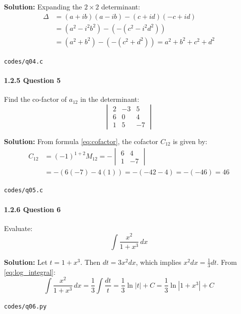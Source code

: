 \documentclass{article}
\begin{document}
\textbf{Solution:} Expanding the $2 \times 2$ determinant:
\begin{align}
\Delta &= (a + ib)(a - ib) - (c + id)(-c + id) \\
&= (a^2 - i^2 b^2) - (-(c^2 - i^2 d^2)) \\
&= (a^2 + b^2) - (-(c^2 + d^2)) = a^2 + b^2 + c^2 + d^2
\end{align}
\begin{tcolorbox}[colback=gray!10,colframe=black,width=\linewidth]
\texttt{codes/q04.c}
\end{tcolorbox}

\paragraph{1.2.5 Question 5}
Find the co-factor of $a_{12}$ in the determinant:
\begin{equation}
\begin{vmatrix} 2 & -3 & 5 \\ 6 & 0 & 4 \\ 1 & 5 & -7 \end{vmatrix}
\end{equation}

\textbf{Solution:} From formula \eqref{eq:cofactor}, the cofactor $C_{12}$ is given by:
\begin{align}
C_{12} &= (-1)^{1+2} M_{12} = -\begin{vmatrix} 6 & 4 \\ 1 & -7 \end{vmatrix} \\
&= -(6(-7) - 4(1)) = -(-42 - 4) = -(-46) = 46
\end{align}
\begin{tcolorbox}[colback=gray!10,colframe=black,width=\linewidth]
\texttt{codes/q05.c}
\end{tcolorbox}

\paragraph{1.2.6 Question 6}
Evaluate:
\begin{equation}
\int \frac{x^2}{1 + x^3} \, dx
\end{equation}

\textbf{Solution:} Let $t = 1 + x^3$. Then $dt = 3x^2 dx$, which implies $x^2 dx = \frac{1}{3} dt$. From \eqref{eq:log_integral}:
\begin{equation}
\int \frac{x^2}{1 + x^3} \, dx = \frac{1}{3} \int \frac{dt}{t} = \frac{1}{3}\ln|t| + C = \frac{1}{3}\ln|1 + x^3| + C
\end{equation}
\begin{tcolorbox}[colback=gray!10,colframe=black,width=\linewidth]
\texttt{codes/q06.py}
\end{tcolorbox}
\end{document}

